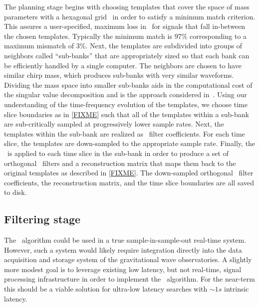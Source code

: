 The planning stage begins with choosing templates that cover the space of mass
parameters with a hexagonal grid~\cite{PhysRevD.76.102004} in order to satisfy
a minimum match criterion.  This assures a user-specified, maximum loss in \SNR\
for signals that fall in-between the chosen templates.  Typically the minimum
match is 97\% corresponding to a maximum mismatch of 3\%.  Next, the templates
are subdivided into groups of neighbors called ``sub-banks'' that are
appropriately sized so that each bank can be efficiently handled by a single
computer.  The neighbors are chosen to have similar chirp mass, which produces
sub-banks with very similar waveforms.  Dividing the mass space into smaller
sub-banks aids in the computational cost of the singular value decomposition
and is the approach considered in~\cite{Cannon:2010p10398}.  Using our
understanding of the time-frequency evolution of the templates, we choose time
slice boundaries as in \eqref{FIXME} such that all of the templates within a
sub-bank are sub-critically sampled at progressively lower sample rates.  Next,
the templates within the sub-bank are realized as \fir\ filter
coefficients.  For each time slice, the templates are down-sampled to the
appropriate sample rate.  Finally, the \SVD\ is applied to each time
slice in the sub-bank in order to produce a set of orthogonal \fir\
filters and a reconstruction matrix that maps them back to the original
templates as described in \eqref{FIXME}.  The down-sampled orthogonal
\fir\ filter coefficients, the reconstruction matrix, and the time slice
boundaries are all saved to disk.

\subsection{Filtering stage}

The \lloid\ algorithm could be used in a true sample-in-sample-out real-time
system.  However, such a system would likely require integration directly into
the data acquisition and storage system of the gravitational wave
observatories.  A slightly more modest goal is to leverage existing low
latency, but not real-time, signal processing infrastructure in order to
implement the \lloid\ algorithm.  For the near-term this should be a viable 
solution for ultra-low latency searches with $\sim 1s$ intrinsic latency.

